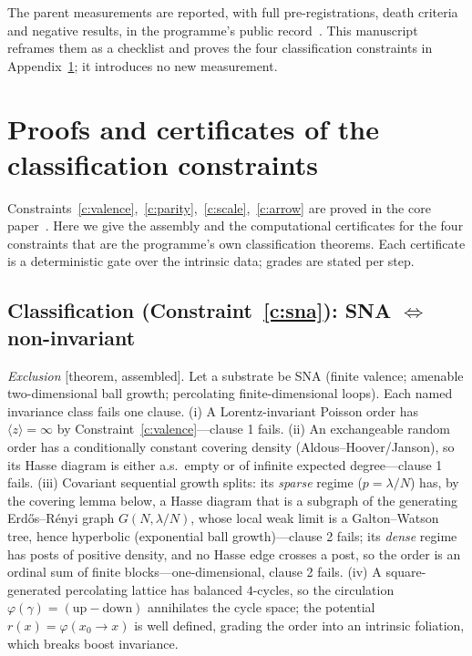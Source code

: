 \documentclass[aps,prd,reprint,nofootinbib,superscriptaddress,floatfix]{revtex4-2}
\begin{document}
\begin{acknowledgments}
The parent measurements are reported, with full pre-registrations, death criteria and negative
results, in the programme's public record~\cite{CorePaper,WenComplement,MatterGravityPRD,SU3PRD}.
This manuscript reframes them as a checklist and proves the four classification constraints in
Appendix~\ref{app:proofs}; it introduces no new measurement.
\end{acknowledgments}

\appendix

\section{Proofs and certificates of the classification constraints}
\label{app:proofs}

Constraints~\ref{c:valence},~\ref{c:parity},~\ref{c:scale},~\ref{c:arrow} are proved in the
core paper~\cite{CorePaper}. Here we give the assembly and the computational certificates for
the four constraints that are the programme's own classification theorems. Each certificate is
a deterministic gate over the intrinsic data; grades are stated per step.

\subsection{Classification (Constraint~\ref{c:sna}): SNA $\Leftrightarrow$ non-invariant}
\label{app:sna}

\emph{Exclusion} [theorem, assembled]. Let a substrate be SNA (finite valence; amenable
two-dimensional ball growth; percolating finite-dimensional loops). Each named invariance class
fails one clause. (i) A Lorentz-invariant Poisson order has $\langle z\rangle=\infty$ by
Constraint~\ref{c:valence}---clause 1 fails. (ii) An exchangeable random order has a
conditionally constant covering density (Aldous--Hoover/Janson), so its Hasse diagram is either
a.s.\ empty or of infinite expected degree---clause 1 fails. (iii) Covariant sequential growth
splits: its \emph{sparse} regime ($p=\lambda/N$) has, by the covering lemma below, a Hasse
diagram that is a subgraph of the generating Erd\H{o}s--R\'enyi graph $G(N,\lambda/N)$, whose
local weak limit is a Galton--Watson tree, hence hyperbolic (exponential ball growth)---clause 2
fails; its \emph{dense} regime has posts of positive density, and no Hasse edge crosses a post,
so the order is an ordinal sum of finite blocks---one-dimensional, clause 2 fails. (iv) A
square-generated percolating lattice has balanced $4$-cycles, so the circulation
$\varphi(\gamma)=(\text{up}-\text{down})$ annihilates the cycle space; the potential
$r(x)=\varphi(x_0\!\to\!x)$ is well defined, grading the order into an intrinsic foliation, which
breaks boost invariance.
\end{document}
